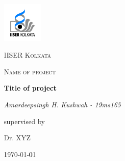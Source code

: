 \documentclass[12pt,a4paper]{report}
\begin{document}
    \begin{titlepage}

        \centering
        \includegraphics[width=0.15\textwidth]{IISER-Kolkata-01.png}\par\vspace{1cm}
        {\scshape\LARGE IISER Kolkata \par}
        \vspace{1cm}
        {\scshape\Large Name of project \par}
        \vspace{1.5cm}
        {\huge\bfseries Title of project \par}
        \vspace{2cm}
        {\Large\itshape Amardeepsingh H. Kushwah - 19ms165 \par}
        \vfill
            supervised by\par
            Dr. XYZ \par
        \vfill

        {\large \today\par}

    \end{titlepage}

    \tableofcontents
    \newpage

    \begin{abstract}
        \vspace{1cm}
        \textbf{Abstract}
        \vspace{1cm}
        \textit{Abstract of the project}
    \end{abstract}
\end{document}
